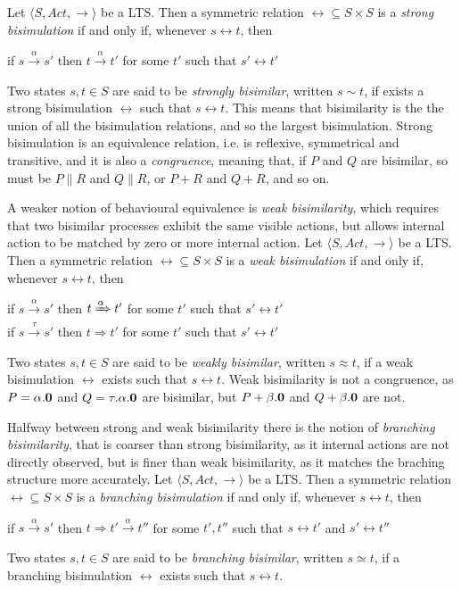 Let $\langle S , Act, \rightarrow \rangle$ be a LTS. Then a symmetric relation $\rel \subseteq S \times S$ is a \textit{strong bisimulation} if and only if, whenever $s \rel t$, then 
\begin{center}
if $s \xrightarrow{\alpha} s'$ then $t \xrightarrow{\alpha} t'$ for some $t'$ such that $s' \rel t'$
\end{center}
Two states $s, t \in S$ are said to be \textit{strongly bisimilar}, written $s \sim t$, if exists a strong bisimulation $\rel$ such that $s \rel t$. This means that bisimilarity is the the union of all the bisimulation relations, and so the largest bisimulation. 
Strong bisimulation is an equivalence relation, i.e. is reflexive, symmetrical and transitive, and it is also a \textit{congruence}, meaning that, if $P$ and $Q$ are bisimilar, so must be $P\parallel R$ and $Q\parallel R$, or $P + R$ and $Q + R$, and so on.



A weaker notion of behavioural equivalence is \textit{weak bisimilarity}, which requires that two bisimilar processes exhibit the same visible actions, but allows internal action to be matched by zero or more internal action.
Let $\langle S , Act, \rightarrow \rangle$ be a LTS. Then a symmetric relation $\rel \subseteq S \times S$ is a \textit{weak bisimulation} if and only if, whenever $s \rel t$, then 
\begin{center}
if $s \xrightarrow{\alpha} s'$ then $t \xRightarrow{\alpha} t'$ for some $t'$ such that $s' \rel t'$ \\
if $s \xrightarrow{\tau} s'$ then $t \Rightarrow t'$ for some $t'$ such that $s' \rel t'$ 
\end{center}
Two states $s, t \in S$ are said to be \textit{weakly bisimilar}, written $s \approx t$, if a weak bisimulation $\rel$ exists such that $s \rel t$.  Weak bisimilarity is not a congruence, as $P = \alpha.\mathbf{0}$ and $Q = \tau.\alpha.\mathbf{0}$ are bisimilar, but $P + \beta.\mathbf{0}$ and $Q + \beta.\mathbf{0}$ are not.


Halfway between strong and weak bisimilarity there is the notion of \textit{branching bisimilarity}, that is coarser than strong bisimilarity, as it internal actions are not directly observed, but is finer than weak bisimilarity, as it matches the braching structure more accurately.
Let $\langle S , Act, \rightarrow \rangle$ be a LTS. Then a symmetric relation $\rel \subseteq S \times S$ is a \textit{branching bisimulation} if and only if, whenever $s \rel t$, then 
\begin{center}
if $s \xrightarrow{\alpha} s'$ then $t \Rightarrow t' \xrightarrow{\alpha} t''$ for some $t', t''$ such that $s \rel t'$ and $s' \rel t''$
\end{center}
Two states $s, t \in S$ are said to be \textit{branching bisimilar}, written $s \simeq t$, if a branching bisimulation $\rel$ exists such that $s \rel t$.

